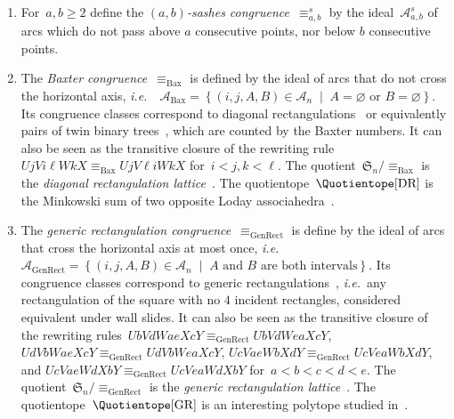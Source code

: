 \documentclass{amsart}
\theoremstyle{definition}
\newcommand{\f}[1]{{\mathfrak{#1}}} %
\newcommand{\set}[2]{\left\{ #1 \;\middle|\; #2 \right\}} %
\newcommand{\ie}{\textit{i.e.}~} %
\newcommand{\darkblue}{\color{darkblue}} %
\newcommand{\defn}[1]{\textsl{\darkblue #1}} %
\newcommand{\vincent}[1]{\todo[color=blue!30]{#1 \\ \hfill --- V.}}
\newcommand{\arcs}{{\mathcal{A}}} %
\begin{document}
\begin{enumerate}
\item \label{item:abSashesCongruence}
For~$a, b \ge 2$ define the \defn{$(a,b)$-sashes congruence}~$\equiv^s_{a,b}$ by the ideal~$\arcs^s_{a,b}$ of arcs which do not pass above $a$ consecutive points, nor below $b$ consecutive points.
\vincent{todo}


\item \label{item:BaxterCongruence}
The \defn{Baxter congruence}~$\equiv_\textrm{Bax}$ is defined by the ideal of arcs that do not cross the horizontal axis, \ie~$\arcs_\textrm{Bax} = \set{(i, j, A, B) \in \arcs_n}{A = \varnothing \text{ or } B = \varnothing}$.
Its congruence classes correspond to diagonal rectangulations~\cite{LawReading} or equivalently pairs of twin binary trees~\cite{Giraudo}, which are counted by the Baxter numbers.
It can also be seen as the transitive closure of the rewriting rule~$U j V i \ell W k X \equiv_{\textrm{Bax}} U j V \ell i W k X$ for~$i < j, k < \ell$.
The quotient~$\f{S}_n / {\equiv_\textrm{Bax}}$ is the \defn{diagonal rectangulation lattice}~\cite{LawReading}.
The quotientope~$\Quotientope[\textrm{DR}]$ is the Minkowski sum of two opposite Loday associahedra~\cite{LawReading}.

\item \label{item:GenericRectangulationCongruence}
The \defn{generic rectangulation congruence}~$\equiv_\textrm{GenRect}$ is define by the ideal of arcs that cross the horizontal axis at most once, \ie~$\arcs_\textrm{GenRect} = \set{(i, j, A, B) \in \arcs_n}{A \text{ and } B \text{ are both intervals}}$.
Its congruence classes correspond to generic rectangulations~\cite{Reading-rectangulations}, \ie any rectangulation of the square with no $4$ incident rectangles, considered equivalent under wall slides.
It can also be seen as the transitive closure of the rewriting rules~$UbVdWaeXcY \equiv_\textrm{GenRect} UbVdWeaXcY$, $UdVbWaeXcY \equiv_\textrm{GenRect} UdVbWeaXcY$, $UcVaeWbXdY \equiv_\textrm{GenRect} UcVeaWbXdY$, and $UcVaeWdXbY \equiv_\textrm{GenRect} UcVeaWdXbY$ for~$a < b < c < d < e$.
The quotient~$\f{S}_n / {\equiv_\textrm{GenRect}}$ is the \defn{generic rectangulation lattice}~\cite{Reading-rectangulations}.
The quotientope~$\Quotientope[\textrm{GR}]$  is an interesting polytope studied in~\cite{CardinalPilaud}.


\end{enumerate}
\end{document}
